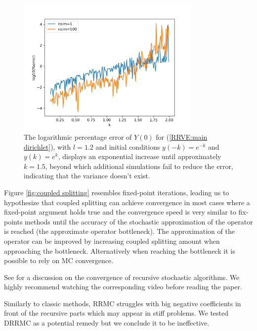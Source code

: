 \documentclass[a4paper,12pt]{article}
\begin{document}
\begin{figure}[h!]
    \centering
    \includegraphics[width=0.8\textwidth]{plots/mainD explosion.png}
    \caption{The logarithmic percentage error of $Y(0)$ for
    (\ref{RRVE:main dirichlet}), with $l=1.2$ and initial conditions
    $y(-k)=e^{-k}$ and $y(k)=e^{k}$, displays an exponential
    increase until approximately $k=1.5$, beyond which additional
    simulations fail to reduce the error, indicating that the variance
    doesn't exist.}
    \label{fig:mainD explosion}
\end{figure}


Figure \ref{fig:coupled splitting}
resembles fixed-point iterations, leading us to hypothesize
that coupled splitting can achieve convergence in most cases
where a fixed-point argument holds true and the convergence
speed is very similar to fix-points methods until the accuracy
of the stochastic approximation of the operator is reached
(the approximate operator bottleneck). The approximation of the operator
can be improved by increasing coupled splitting amount when
approaching the bottleneck. Alternatively when reaching
the bottleneck it is possible to rely on MC convergence.

\begin{related}
    See \cite{gupta_convergence_2021} for a discussion on the convergence
    of recursive stochastic algorithms. We highly recommend watching
    the corresponding video \cite{abhishek_gupta_recursive_2020} before reading
    the paper.
\end{related}


Similarly to classic methods, RRMC struggles with big negative coefficients in front
of the recursive parts which may appear in
stiff problems. We tested DRRMC as a potential remedy but we conclude
it to be ineffective.
\end{document}
